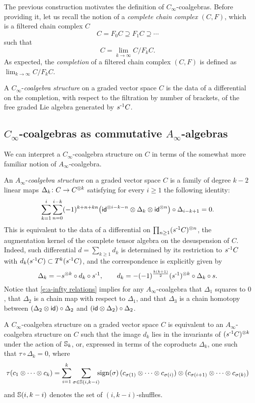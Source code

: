 The previous construction motivates the definition of $C_\infty$-coalgebras.
Before providing it, let us recall the notion of a \textit{complete chain complex} $(C, F)$, which is a filtered chain complex $C$
\[
C = F_0 C \supseteq F_1 C \supseteq \cdots
\]
such that
\[
C = \lim_{k\to \infty} C / F_k C.
\]
As expected, the \textit{completion} of a filtered chain complex $(C, F)$ is defined as $\lim_{k\to \infty} C / F_k C$.

A $C_\infty$-\textit{coalgebra structure} on a graded vector space $C$ is the data of a differential on the completion, with respect to the filtration by number of brackets, of the free graded Lie algebra generated by $s^{\mbox{\scriptsize -1}}C$.

\subsection{$C_\infty$-coalgebras as commutative $A_\infty$-algebras} \label{ss:a-infty coalgebras}

We can interpret a $C_\infty$-coalgebra structure on $C$ in terms of the somewhat more familiar notion of $A_\infty$-coalgebra.

An $A_\infty$-\textit{coalgebra structure} on a graded vector space $C$ is a family of degree $k-2$ linear maps $\Delta_k \colon C \to C^{\otimes k}$ satisfying for every $i \geq 1$ the following identity:
\begin{equation} \label{e:a-infty relations}
\sum_{k=1}^{i} \sum_{n=0}^{i-k} (-1)^{k+n+kn} \big( \mathsf{id}^{\otimes i-k-n} \otimes \Delta_k \otimes \mathsf{id}^{\otimes n} \big) \circ \Delta_{i-k+1} = 0.
\end{equation}
This is equivalent to the data of a differential on $\prod_{n \geq 1} (s^{\mbox{\scriptsize -1}} C)^{\otimes n}$, the augmentation kernel of the complete tensor algebra on the desuspension of $C$.
Indeed, such differential $d = \sum_{k \geq 1} d_k$ is determined by its restriction to $s^{\mbox{\scriptsize -1}} C$ with $d_k(s^{\mbox{\scriptsize -1}} C) \subset T^k(s^{\mbox{\scriptsize -1}} C)$, and the correspondence is explicitly given by
\[
\Delta_k = - s^{\otimes k} \circ d_k \circ s^{\mbox{\scriptsize -1}},
\qquad
d_k = -(-1)^{\frac{k(k+1)}{2}} (s^{\mbox{\scriptsize -1}})^{\otimes k} \circ \Delta_k \circ s.
\]
Notice that \eqref{e:a-infty relations} implies for any $A_\infty$-coalgebra that $\Delta_1$ squares to $0$, that $\Delta_2$ is a chain map with respect to $\Delta_1$, and that $\Delta_3$ is a chain homotopy between $(\Delta_2 \otimes \mathsf{id}) \circ \Delta_2$ and $(\mathsf{id} \otimes \Delta_2) \circ \Delta_2$.

A $C_\infty$-coalgebra structure on a graded vector space $C$ is equivalent to an $A_\infty$-coalgebra structure on $C$ such that the image $d_k$ lies in the invariants of $(s^{\mbox{\scriptsize -1}} C)^{\otimes k}$ under the action of $\mathbb{S}_k$, or, expressed in terms of the coproducts $\Delta_k$, one such that $\tau \circ \Delta_k = 0$, where
\[
\tau(c_1 \otimes \dotsb \otimes c_k) =
\sum_{i=1}^{k} \sum_{\sigma \in \mathbb{S}(i, k-i)}
\!\!\! \operatorname{sign}(\sigma) \,
(c_{\sigma(1)} \otimes \dotsb \otimes c_{\sigma(i)}) \otimes
(c_{\sigma(i+1)} \otimes \dotsb \otimes c_{\sigma(k)})
\]
and $\mathbb{S}(i, k-i)$ denotes the set of $(i, k-i)$-shuffles.

